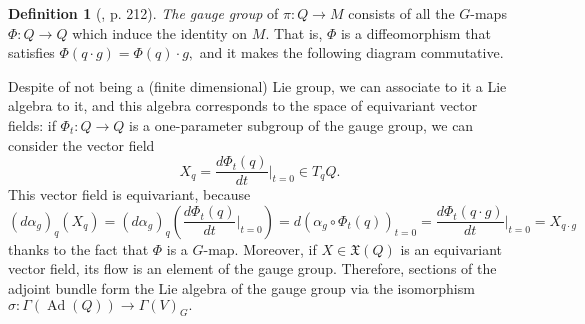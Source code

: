 \documentclass[12pt, letterpaper, reqno]{amsart}
\theoremstyle{definition}
\newtheorem{df}{Definition}
\theoremstyle{plain}
\theoremstyle{remark}
\begin{document}
\begin{df}[\cite{montgomery2002tour}, p. 212]
	\textit{The gauge group} of $ \pi: Q \rightarrow M $ consists of all the $ G $-maps $ \Phi: Q \rightarrow  Q$ which induce the identity on $ M. $ That is, $ \Phi $ is a diffeomorphism that satisfies $ \Phi(q\cdot g) =\Phi(q)\cdot g, $ and it makes the following diagram commutative.
	\begin{center}
	\end{center}
\end{df}
Despite of not being a (finite dimensional) Lie group, we can associate to it a Lie algebra to it, and this algebra corresponds to the space of equivariant vector fields: if $ \Phi_t: Q \rightarrow Q $ is a one-parameter subgroup of the gauge group, we can consider the vector field $$ X_q = \frac{d \Phi_t(q)}{dt} \Big|_{t=0}\in T_qQ. $$ This vector field is equivariant, because $$ (d\alpha_g)_q(X_q)=(d\alpha_g)_q \left( \frac{d \Phi_t(q)}{dt} \Big|_{t=0} \right)= d(\alpha_g \circ \Phi_t(q))_{t=0}= \frac{d\Phi_t(q\cdot g)}{dt} \Big|_{t=0}=X_{q\cdot g}  $$
thanks to the fact that $ \Phi $ is a $ G $-map. Moreover, if $ X\in \mathfrak{X}(Q) $ is an equivariant vector field, its flow is an element of the gauge group. Therefore, sections of the adjoint bundle form the Lie algebra of the gauge group via the isomorphism $ \sigma: \Gamma( \operatorname{Ad} (Q)) \rightarrow  \Gamma(V)_G. $ 
\end{document}
